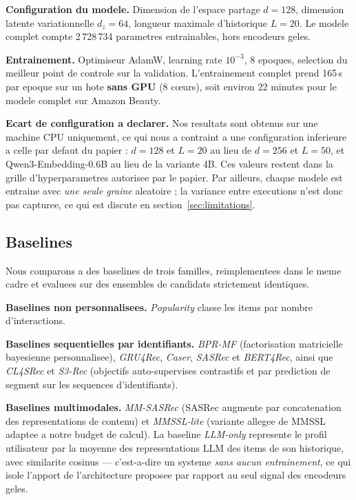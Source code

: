 \textbf{Configuration du modele.} Dimension de l'espace partage $d=128$,
dimension latente variationnelle $d_z=64$, longueur maximale d'historique
$L=20$. Le modele complet compte 2\,728\,734 parametres entrainables, hors
encodeurs geles.

\textbf{Entrainement.} Optimiseur AdamW, learning rate $10^{-3}$, 8 epoques,
selection du meilleur point de controle sur la validation. L'entrainement
complet prend 165\,s par epoque sur un hote \textbf{sans GPU} (8 c\oe{}urs),
soit environ 22 minutes pour le modele complet sur Amazon Beauty.

\textbf{Ecart de configuration a declarer.} Nos resultats sont obtenus sur une
machine CPU uniquement, ce qui nous a contraint a une configuration inferieure
a celle par defaut du papier : $d=128$ et $L=20$ au lieu de $d=256$ et $L=50$,
et Qwen3-Embedding-0.6B au lieu de la variante 4B. Ces valeurs restent dans la
grille d'hyperparametres autorisee par le papier. Par ailleurs, chaque modele
est entraine avec \emph{une seule graine} aleatoire ; la variance entre
executions n'est donc pas capturee, ce qui est discute en
section~\ref{sec:limitations}.

\subsection{Baselines}
\label{sec:baselines}

Nous comparons \model{} a des baselines de trois familles, reimplementees dans
le meme cadre et evaluees sur des ensembles de candidats strictement identiques.

\textbf{Baselines non personnalisees.} \emph{Popularity} classe les items par
nombre d'interactions.

\textbf{Baselines sequentielles par identifiants.} \emph{BPR-MF} (factorisation
matricielle bayesienne personnalisee), \emph{GRU4Rec}, \emph{Caser},
\emph{SASRec} et \emph{BERT4Rec}, ainsi que \emph{CL4SRec} et \emph{S3-Rec}
(objectifs auto-supervises contrastifs et par prediction de segment sur les
sequences d'identifiants).

\textbf{Baselines multimodales.} \emph{MM-SASRec} (SASRec augmente par
concatenation des representations de contenu) et \emph{MMSSL-lite} (variante
allegee de MMSSL adaptee a notre budget de calcul). La baseline
\emph{LLM-only} represente le profil utilisateur par la moyenne des
representations LLM des items de son historique, avec similarite cosinus ---
c'est-a-dire un systeme \emph{sans aucun entrainement}, ce qui isole l'apport
de l'architecture proposee par rapport au seul signal des encodeurs geles.

